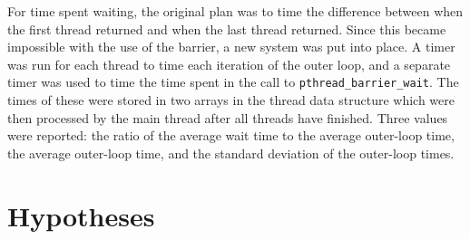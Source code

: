 \documentclass{article}
\begin{document}
For time spent waiting, the original plan was to time the difference between when the first thread returned and when the last thread returned. Since this became impossible with the use of the barrier, a new system was put into place. A timer was run for each thread to time each iteration of the outer loop, and a separate timer was used to time the time spent in the call to \verb|pthread_barrier_wait|. The times of these were stored in two arrays in the thread data structure which were then processed by the main thread after all threads have finished. Three values were reported: the ratio of the average wait time to the average outer-loop time, the average outer-loop time, and the standard deviation of the outer-loop times. 
\section*{Hypotheses}
\end{document}
